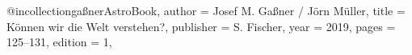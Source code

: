 @incollection{gaßnerAstroBook,
  author    = {Josef M. Gaßner / Jörn Müller},
  title     = {Können wir die Welt verstehen?},
  publisher = {S. Fischer},
  year      = {2019},
  pages     = {125--131},
  edition   = {1},
}
